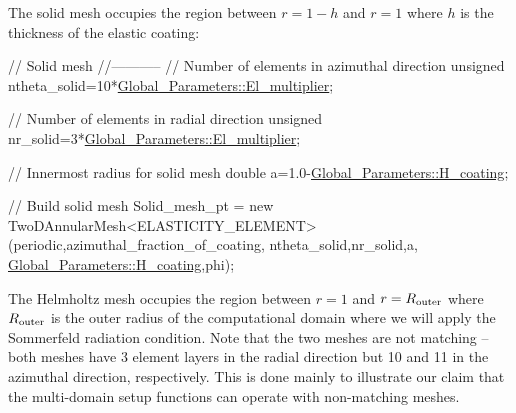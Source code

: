 The solid mesh occupies the region between $ r = 1-h $ and $ r=1 $ where $ h $ is the thickness of the elastic coating\+:


\begin{DoxyCodeInclude}

 \textcolor{comment}{// Solid mesh}
 \textcolor{comment}{//-----------}
 \textcolor{comment}{// Number of elements in azimuthal direction}
 \textcolor{keywordtype}{unsigned} ntheta\_solid=10*\hyperlink{namespaceGlobal__Parameters_a35d5d2ecfff0cec6150a5dc79e5c1ad1}{Global\_Parameters::El\_multiplier};

 \textcolor{comment}{// Number of elements in radial direction }
 \textcolor{keywordtype}{unsigned} nr\_solid=3*\hyperlink{namespaceGlobal__Parameters_a35d5d2ecfff0cec6150a5dc79e5c1ad1}{Global\_Parameters::El\_multiplier};
 
 \textcolor{comment}{// Innermost radius for solid mesh}
 \textcolor{keywordtype}{double} a=1.0-\hyperlink{namespaceGlobal__Parameters_ae3cf8878ede839bffda01f79bbe3e819}{Global\_Parameters::H\_coating};
 
 \textcolor{comment}{// Build solid mesh}
 Solid\_mesh\_pt = \textcolor{keyword}{new} 
  TwoDAnnularMesh<ELASTICITY\_ELEMENT>(periodic,azimuthal\_fraction\_of\_coating,
                                      ntheta\_solid,nr\_solid,a,
                                      \hyperlink{namespaceGlobal__Parameters_ae3cf8878ede839bffda01f79bbe3e819}{Global\_Parameters::H\_coating},phi);

\end{DoxyCodeInclude}


The Helmholtz mesh occupies the region between $ r = 1 $ and $ r=R_{\rm outer} $ where $ R_{\rm outer}$ is the outer radius of the computational domain where we will apply the Sommerfeld radiation condition. Note that the two meshes are not matching -- both meshes have 3 element layers in the radial direction but 10 and 11 in the azimuthal direction, respectively. This is done mainly to illustrate our claim that the multi-\/domain setup functions can operate with non-\/matching meshes.


